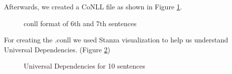 \documentclass[12pt, a4paper]{article}
\begin{document}
	Afterwards, we created a CoNLL file as shown in Figure \ref{parsing_conll}. 
	\begin{figure}[H]
		\caption{conll format of 6th and 7th sentences}
		\label{parsing_conll}
	\end{figure}
	
	For creating the .conll we used Stanza visualization to help us understand Universal Dependencies. (Figure \ref{parsing_examples_UDtree})
	\begin{figure}[H]
		\caption{Universal Dependencies for 10 sentences}
		\label{parsing_examples_UDtree}
	\end{figure}
	
\end{document}
